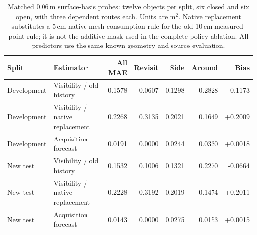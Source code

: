 \begin{table}[!htbp]
\centering\small
\caption{Matched 0.06\,m surface-basis probes: twelve objects per split, six closed and six open, with three dependent routes each. Units are m$^2$. Native replacement substitutes a 5\,cm native-mesh consumption rule for the old 10\,cm measured-point rule; it is not the additive mask used in the complete-policy ablation. All predictors use the same known geometry and source evaluation.}
\label{tab:acquisition-fixtures}
\begin{tabular}{llrrrrr}
\toprule
Split & Estimator & All MAE & Revisit & Side & Around & Bias \\
\midrule
Development & Visibility / old history & 0.1578 & 0.0607 & 0.1298 & 0.2828 & -0.1173 \\
Development & Visibility / native replacement & 0.2268 & 0.3135 & 0.2021 & 0.1649 & +0.2009 \\
Development & Acquisition forecast & 0.0191 & 0.0000 & 0.0244 & 0.0330 & +0.0018 \\
New test & Visibility / old history & 0.1532 & 0.1006 & 0.1321 & 0.2270 & -0.0664 \\
New test & Visibility / native replacement & 0.2228 & 0.3192 & 0.2019 & 0.1474 & +0.2011 \\
New test & Acquisition forecast & 0.0143 & 0.0000 & 0.0275 & 0.0153 & +0.0015 \\
\bottomrule
\end{tabular}
\end{table}

